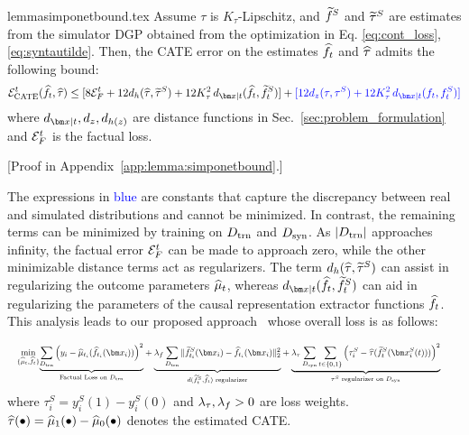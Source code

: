 \begin{filecontents*}{lemmasimponetbound.tex}
Assume $\tau$ is $K_{\tau}$-Lipschitz, and $\SInvTilde$ and $\syntauTilde$ are estimates from the simulator DGP obtained from the optimization in Eq. \ref{eq:cont_loss}, \ref{eq:syntautilde}. Then, the CATE error on the estimates $\RInvhat_t$ and $\tauhat$ admits the following bound: 
    \begin{align*}
      \ErrITE^t(\RInvhat_t, \tauhat)  \leq [8\ErrF^t + 12d_{h}(\tauhat, \syntauTilde) + 12 K_{\tau}^2 \,d_{\xb|t}(\RInvhat_t,\SInvTilde_t)] + \textcolor{blue}{[12 d_z(\tau, \syntau) + 12 K_{\tau}^2 \,d_{\xb|t}(\RInv_t,\SInv_t)]}
\end{align*}
 where $d_{\xb|t}, d_z, d_{h(z)}$ are distance functions in Sec.~\ref{sec:problem_formulation} and $\ErrF^t$ is the factual loss.\end{filecontents*}
\begin{lemma}
\label{lemma:simponetbound}

 [Proof in Appendix~\ref{app:lemma:simponetbound}.]
\end{lemma}
The expressions in \textcolor{blue}{blue} are constants that capture the discrepancy between real and simulated distributions and cannot be minimized. In contrast, the remaining terms can be minimized by training on $D_{\text{trn}}$ and $D_{\text{syn}}$. As $|D_{\text{trn}}|$ approaches infinity, the factual error $\mathcal{E}_F^t$ can be made to approach zero, while the other minimizable distance terms act as regularizers. The term $d_{h}(\widehat{\tau}, \widetilde{\tau}^S)$ can assist in regularizing the outcome parameters $\widehat{\mu}_t$, whereas $d_{\xb|t}(\RInvhat_t, \SInvTilde_t)$ can aid in regularizing the parameters of the causal representation extractor functions $\widehat{f}_t$. This analysis leads to our proposed approach \our\ whose overall loss is as follows:



\begin{equation}
\label{eq:overall_objective}
\resizebox{\textwidth}{!}{%
  $\begin{aligned}
    \min_{\{\realmuhat_t, \RInvhat_t\}} 
     & {\underbrace{%
        \sum_{\trnD}\left(y_i - \realmuhat_{t_i}(\RInvhat_{t_i}(\xb_i))\right)^2
        }_{\text{Factual Loss on $\trnD$}}}  + 
     {\underbrace{%
          \Lphi \sum_{\trnD} \Vert \SInvCont_{t_i}(\xb_i) - \RInvhat_{t_i}(\xb_i) \Vert_2^2
        }_{d(\SInvCont_t, \RInvhat_t) \text{ regularizer}}}  +
     {\underbrace{%
        \Ltau \sum_{\synD} \sum_{t \in \{0,1\}}
        \left(\tau^S_i -  \widehat{\tau}(\SInvCont_{t}(\xb_i^S(t))) \right)^2
        }_{
        \tau^S \text{ regularizer on }\synD
        }} 
    \end{aligned}$ 
    }
\end{equation}
where $\tau^S_i = y_i^S(1) - y_i^S(0)$ and $\lambda_{\tau}, \lambda_{f} > 0$ are loss weights. $\widehat{\tau}(\bullet) = \widehat{\mu}_1(\bullet) - \widehat{\mu}_0(\bullet)$ denotes the estimated CATE.

